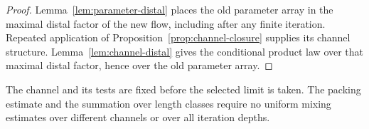 \begin{proof}
Lemma~\ref{lem:parameter-distal} places the old parameter array in
the maximal distal factor of the new flow, including after any finite
iteration.  Repeated application of
Proposition~\ref{prop:channel-closure} supplies its channel structure.
Lemma~\ref{lem:channel-distal} gives the conditional product law over
that maximal distal factor, hence over the old parameter array.
\end{proof}

The channel and its tests are fixed before the selected limit is
taken.  The packing estimate and the summation over length classes
require no uniform mixing estimates over different channels or over
all iteration depths.
